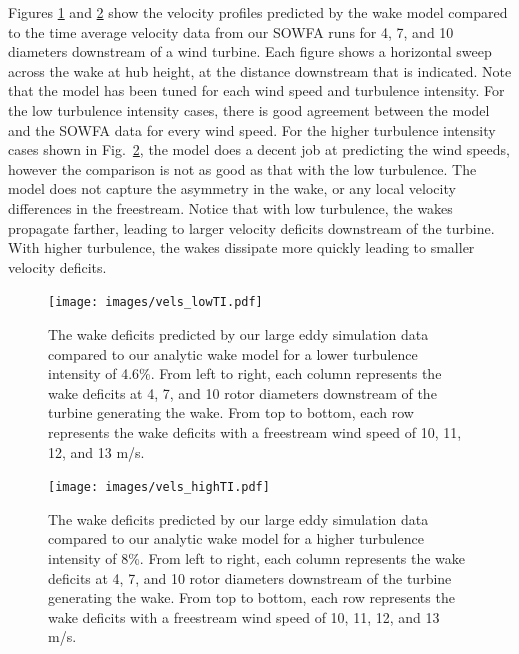 \documentclass[11pt,letterpaper]{article}
\begin{document}
Figures \ref{vels_lowTI} and \ref{vels_highTI} show the velocity profiles predicted by the wake model compared to the time average velocity data from our SOWFA runs for 4, 7, and 10 diameters downstream of a wind turbine. Each figure shows a horizontal sweep across the wake at hub height, at the distance downstream that is indicated. Note that the model has been tuned for each wind speed and turbulence intensity. For the low turbulence intensity cases, there is good agreement between the model and the SOWFA data for every wind speed. For the higher turbulence intensity cases shown in Fig.~\ref{vels_highTI}, the model does a decent job at predicting the wind speeds, however the comparison is not as good as that with the low turbulence. The model does not capture the asymmetry in the wake, or any local velocity differences in the freestream. Notice that with low turbulence, the wakes propagate farther, leading to larger velocity deficits downstream of the turbine. With higher turbulence, the wakes dissipate more quickly leading to smaller velocity deficits. 
% 
% 
\begin{figure}
    \centering
    \texttt{[image: images/vels\_lowTI.pdf]}
    \caption{The wake deficits predicted by our large eddy simulation data compared to our analytic wake model for a lower turbulence intensity of 4.6\%. From left to right, each column represents the wake deficits at 4, 7, and 10 rotor diameters downstream of the turbine generating the wake. From top to bottom, each row represents the wake deficits with a freestream wind speed of 10, 11, 12, and 13 m/s.}
    \label{vels_lowTI}
\end{figure}
% 
\begin{figure}
    \centering
    \texttt{[image: images/vels\_highTI.pdf]}
    \caption{The wake deficits predicted by our large eddy simulation data compared to our analytic wake model for a higher turbulence intensity of 8\%. From left to right, each column represents the wake deficits at 4, 7, and 10 rotor diameters downstream of the turbine generating the wake. From top to bottom, each row represents the wake deficits with a freestream wind speed of 10, 11, 12, and 13 m/s.}
    \label{vels_highTI}
\end{figure}
\end{document}
